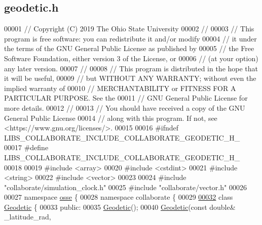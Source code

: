 \hypertarget{geodetic_8h_source}{}\subsection{geodetic.\+h}
\label{geodetic_8h_source}

\begin{DoxyCode}
00001 \textcolor{comment}{// Copyright (C) 2019 The Ohio State University}
00002 \textcolor{comment}{//}
00003 \textcolor{comment}{// This program is free software: you can redistribute it and/or modify}
00004 \textcolor{comment}{// it under the terms of the GNU General Public License as published by}
00005 \textcolor{comment}{// the Free Software Foundation, either version 3 of the License, or}
00006 \textcolor{comment}{// (at your option) any later version.}
00007 \textcolor{comment}{//}
00008 \textcolor{comment}{// This program is distributed in the hope that it will be useful,}
00009 \textcolor{comment}{// but WITHOUT ANY WARRANTY; without even the implied warranty of}
00010 \textcolor{comment}{// MERCHANTABILITY or FITNESS FOR A PARTICULAR PURPOSE.  See the}
00011 \textcolor{comment}{// GNU General Public License for more details.}
00012 \textcolor{comment}{//}
00013 \textcolor{comment}{// You should have received a copy of the GNU General Public License}
00014 \textcolor{comment}{// along with this program.  If not, see <https://www.gnu.org/licenses/>.}
00015 
00016 \textcolor{preprocessor}{#ifndef LIBS\_COLLABORATE\_INCLUDE\_COLLABORATE\_GEODETIC\_H\_}
00017 \textcolor{preprocessor}{#define LIBS\_COLLABORATE\_INCLUDE\_COLLABORATE\_GEODETIC\_H\_}
00018 
00019 \textcolor{preprocessor}{#include <array>}
00020 \textcolor{preprocessor}{#include <cstdint>}
00021 \textcolor{preprocessor}{#include <string>}
00022 \textcolor{preprocessor}{#include <vector>}
00023 
00024 \textcolor{preprocessor}{#include "collaborate/simulation\_clock.h"}
00025 \textcolor{preprocessor}{#include "collaborate/vector.h"}
00026 
00027 \textcolor{keyword}{namespace }\hyperlink{namespaceosse}{osse} \{
00028 \textcolor{keyword}{namespace }collaborate \{
00029 
\hyperlink{classosse_1_1collaborate_1_1_geodetic}{00032} \textcolor{keyword}{class }\hyperlink{classosse_1_1collaborate_1_1_geodetic}{Geodetic} \{
00033  \textcolor{keyword}{public}:
00035   \hyperlink{classosse_1_1collaborate_1_1_geodetic_a8c111a79dfe50da43aa21f6256ffa13c}{Geodetic}();
00040   \hyperlink{classosse_1_1collaborate_1_1_geodetic_a8c111a79dfe50da43aa21f6256ffa13c}{Geodetic}(\textcolor{keyword}{const} \textcolor{keywordtype}{double}& \_latitude\_rad,

\end{DoxyCode}
